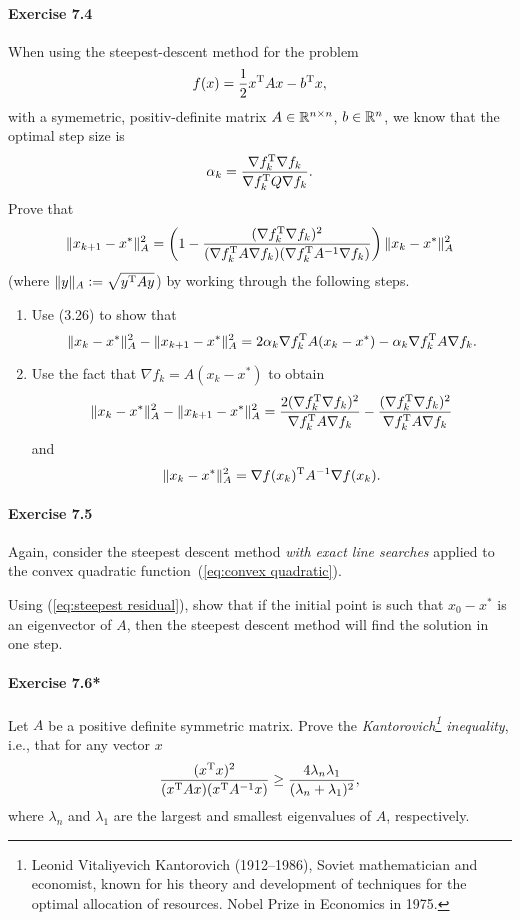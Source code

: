 \paragraph{Exercise 7.4} %
When using the steepest-descent method for the problem
\begin{equation}\label{eq:convex quadratic}
   f(x) = \frac{1}{2} x^{\text{\upshape T}} A x - b^{\text{\upshape T}} x,
\end{equation}
with a symemetric, positiv-definite matrix $A\in\mathbb{R}^{n\times n}$, $b\in\mathbb{R}^n$,
we know that the optimal step size is
\[
  \alpha_k = \frac{\nabla f_k^{\text{\upshape T}} \nabla f_k}{\nabla f_k^{\text{\upshape T}} Q \nabla f_k}.
\]
Prove that
\begin{equation}\label{eq:steepest residual}
  \|x_{k+1} - x^*\|_A^2
  = \left(1 - \frac{(\nabla f_k^{\text{\upshape T}}\nabla f_k)^2}{(\nabla f_k^{\text{\upshape T}} A\nabla f_k)(\nabla f_k^{\text{\upshape T}} A^{-1} \nabla f_k)}\right)\|x_{k} - x^*\|_A^2
\end{equation}
(where $\|y\|_A\mathrel{\mathop:}= \sqrt{y^{\text{\upshape T}} Ay}$)
by working through the following steps.
\begin{enumerate}
  \item Use (3.26) to show that
\[
  \|x_k - x^*\|_A^2 - \|x_{k+1} - x^*\|_A^2 = 2\alpha_k\nabla f_k^{\text{\upshape T}} A(x_k-x^*) - \alpha_k \nabla f_k^{\text{\upshape T}} A \nabla f_k.
\]
  \item Use the fact that $\nabla f_k = A(x_k - x^*)$ to obtain
    \[
      \|x_k-x^*\|_A^2 - \|x_{k+1}-x^*\|_A^2
      = \frac{2(\nabla f_k^{\text{\upshape T}} \nabla f_k)^2}{\nabla f_k^{\text{\upshape T}} A \nabla f_k} - \frac{(\nabla f_k^{\text{\upshape T}} \nabla f_k)^2}{\nabla f_k^{\text{\upshape T}} A \nabla f_k}
    \]
    and
    \[
      \|x_k-x^*\|_A^2 = \nabla f(x_k)^{\text{\upshape T}} A^{-1} \nabla f(x_k).
    \]
\end{enumerate}


\paragraph{Exercise 7.5} %
Again, consider the steepest descent method \emph{with exact line searches}
applied to the convex quadratic function~(\ref{eq:convex quadratic}).

Using (\ref{eq:steepest residual}), show that if the initial point is such
that $x_0 - x^*$ is an eigenvector of $A$, then the steepest
descent method will find the solution in one step.

\paragraph{Exercise 7.6*}
Let $A$ be a positive definite symmetric matrix. Prove the
\emph{Kantorovich\footnote{Leonid Vitaliyevich Kantorovich (1912--1986),
    Soviet mathematician and economist, known for his theory and development
    of techniques for the optimal allocation of resources. Nobel Prize in
    Economics in 1975.} inequality}, i.e., that for any vector $x$
\[
  \frac{(x^{\text{\upshape T}} x)^2}{(x^{\text{\upshape T}} A x)(x^{\text{\upshape T}} A^{-1}x)}
  \ge \frac{4\lambda_n\lambda_1}{(\lambda_n + \lambda_1)^2},
\]
where $\lambda_n$ and $\lambda_1$ are the largest and smallest eigenvalues of
$A$, respectively.

